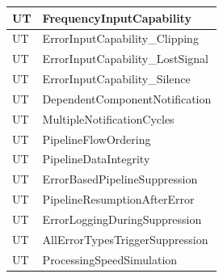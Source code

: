 \documentclass[12pt, titlepage]{article}
\newcounter{unitTest}
\newcommand{\mtheunitTest}{UT\theunitTest}
\begin{document}
{\begin{longtable}{|p{2cm}|p{11cm}|}
    {unitTest} \mtheunitTest \label{FrequencyInputCapability} &
    FrequencyInputCapability \\ \hline
    {unitTest} \mtheunitTest
    \label{ErrorInputCapability_Clipping} & ErrorInputCapability\_Clipping \\
    \hline
    {unitTest} \mtheunitTest
    \label{ErrorInputCapability_LostSignal} & ErrorInputCapability\_LostSignal
    \\ \hline
    {unitTest} \mtheunitTest \label{ErrorInputCapability_Silence}
    & ErrorInputCapability\_Silence \\ \hline
    {unitTest} \mtheunitTest
    \label{DependentComponentNotification} & DependentComponentNotification \\
    \hline
    {unitTest} \mtheunitTest \label{MultipleNotificationCycles} &
    MultipleNotificationCycles \\ \hline
    {unitTest} \mtheunitTest \label{PipelineFlowOrdering} &
    PipelineFlowOrdering \\ \hline
    {unitTest} \mtheunitTest \label{PipelineDataIntegrity} &
    PipelineDataIntegrity \\ \hline
    {unitTest} \mtheunitTest
    \label{ErrorBasedPipelineSuppression} & ErrorBasedPipelineSuppression \\
    \hline
    {unitTest} \mtheunitTest \label{PipelineResumptionAfterError}
    & PipelineResumptionAfterError \\ \hline
    {unitTest} \mtheunitTest
    \label{ErrorLoggingDuringSuppression} & ErrorLoggingDuringSuppression \\
    \hline
    {unitTest} \mtheunitTest
    \label{AllErrorTypesTriggerSuppression} & AllErrorTypesTriggerSuppression \\
    \hline
    {unitTest} \mtheunitTest \label{ProcessingSpeedSimulation} &
    ProcessingSpeedSimulation \\ \hline


\end{longtable}}
\end{document}
